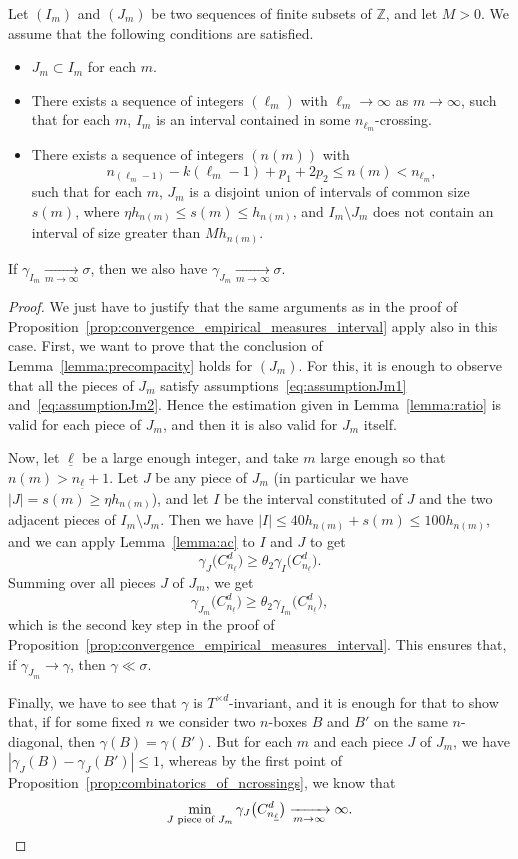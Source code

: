 \documentclass[AHL,Unicode,longabstracts]{cedram}
\newcommand{\tend}[3][]{\xrightarrow[#2\to#3]{#1}}
\newcommand{\ZZ}{\mathbb{Z}}
\newcommand{\cd}{C^{d}}
\newcommand{\td}{T^{\times d}}
\newcommand{\lb}{\underline{\ell}}
\newcommand{\Gam}[1]{\gamma_{#1}\bigl(\cd_{n_{\lb}}\bigr)}
\begin{document}
\begin{prop}\label{prop:convergence_empirical_measures_pieces}
Let $(I_m)$ and $(J_m)$ be two sequences of finite subsets of $\ZZ$, and let $M>0$. We assume that the following conditions are satisfied.
\begin{itemize}
\item $J_m\subset I_m$ for each $m$.
\item There exists a sequence of integers $(\ell_m)$ with $\ell_m\to\infty$ as $m\to\infty$, such that for each $m$, $I_m$ is an interval contained in some $n_{\ell_m}$-crossing.
\item There exists a sequence of integers $(n(m))$ with
\[
n_{(\ell_m-1)} - k(\ell_m-1)+p_1+2p_2 \le n(m) < n_{\ell_m},
\]
such that for each $m$, $J_m$ is a disjoint union of intervals of common size $s(m)$, where $\eta h_{n(m)}\le s(m) \le h_{n(m)}$, and $I_m\setminus J_m$ does not contain an interval of size greater than $Mh_{n(m)}$.
\end{itemize}

If $\gamma_{I_m}\tend{m}{\infty}\sigma$, then we also have $\gamma_{J_m}\tend{m}{\infty}\sigma$.
\end{prop}

\begin{proof}
We just have to justify that the same arguments as in the proof of Proposition~\ref{prop:convergence_empirical_measures_interval} apply also in this case. First, we want to prove that the conclusion of Lemma~\ref{lemma:precompacity} holds for $(J_m)$. For this, it is enough to observe that all the pieces of $J_m$ satisfy assumptions~\eqref{eq:assumptionJm1} and~\eqref{eq:assumptionJm2}. Hence the estimation given in Lemma~\ref{lemma:ratio} is valid for each piece of $J_m$, and then it is also valid for $J_m$ itself.

Now, let $\lb$ be a large enough integer, and take $m$ large enough so that $n(m)>n_{\lb}+1$. Let $J$ be any piece of $J_m$ (in particular we have $|J|=s(m)\ge \eta h_{n(m)}$), and let $I$ be the interval constituted of $J$ and the two adjacent pieces of $I_m\setminus J_m$. Then we have $|I|\le 40 h_{n(m)}+s(m) \le 100 h_{n(m)}$, and we can apply Lemma~\ref{lemma:ac} to $I$ and $J$ to get
\[
\Gam{J} \ge \theta_2 \Gam{I}.
\]
Summing over all pieces $J$ of $J_m$, we get
\[
\Gam{J_m} \ge \theta_2 \Gam{I_m},
\]
which is the second key step in the proof of Proposition~\ref{prop:convergence_empirical_measures_interval}. This ensures that, if $\gamma_{J_m}\to\gamma$, then $\gamma\ll\sigma$.

Finally, we have to see that $\gamma$ is $\td$-invariant, and it is enough for that to show that, if for some fixed $n$ we consider two $n$-boxes $B$ and $B'$ on the same $n$-diagonal, then $\gamma(B)=\gamma(B')$. But for each $m$ and each piece $J$ of $J_m$, we have $\left| \gamma_J(B) - \gamma_J(B') \right| \le 1$, whereas by the first point of Proposition~\ref{prop:combinatorics_of_ncrossings}, we know that
\[
\min_{J\text{ piece of }J_m} \Gam{J} \tend{m}{\infty} \infty.\qedhere
\]
\end{proof}
\end{document}
